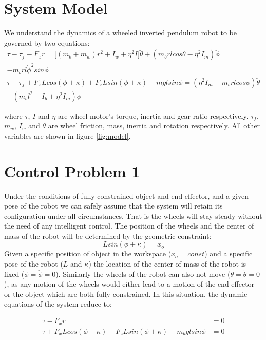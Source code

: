 \documentclass[a4paper,10pt]{article}
\begin{document}
\section{System Model}
We understand the dynamics of a wheeled inverted pendulum robot to be governed by two equations:
{\small
\begin{align}
 \tau - \tau_f - F_x r = \lbrack(m_b + m_w)r^2 + I_w + \eta^2 I\rbrack\ddot{\theta} + (m_brlcos\theta -\eta^2I_m)\ddot{\phi}&\nonumber \\
 - m_brl\dot{\phi}^2 sin\phi& \\
 \tau - \tau_f + F_x L cos(\phi+\kappa) + F_z L sin(\phi+\kappa) - mglsin\phi = (\eta^2I_m - m_brlcos\phi)\ddot{\theta}&  \nonumber \\
 - (m_bl^2+I_b+\eta^2I_m)\ddot{\phi}&
\end{align}
}

where $\tau$, $I$ and $\eta$ are wheel motor's torque, inertia and gear-ratio respectively. $\tau_f$, $m_w$, $I_w$ and $\theta$ are
wheel friction, mass, inertia and rotation respectively. All other variables are shown in figure \ref{fig:model}.

\section{Control Problem 1}
Under the conditions of fully constrained object and end-effector, and a given pose of the robot
we can safely assume that the system will retain its configuration under all circumstances. That is
the wheels will stay steady without the need of any intelligent control. The position of the wheels and the center 
of mass of the robot will be determined by the geometric constraint:
\[
  Lsin(\phi+\kappa) = x_o 
\]
Given a specific position of object in the workspace ($x_o = const$) and a specific pose of the robot ($L$ and $\kappa$)
the location of the center of mass of the robot is fixed ($\dot\phi = \ddot\phi = 0$). Similarly the wheels
of the robot can also not move ($\dot\theta = \ddot\theta = 0$), as any motion of the wheels would either lead to a motion of the end-effector or 
the object which are both fully constrained. In this situation, the dynamic equations of the system reduce to:

\begin{align}
 \tau - F_xr &= 0 \\
 \tau + F_xLcos(\phi+\kappa) + F_zLsin(\phi+\kappa) - m_bglsin\phi &= 0 \label{eq:FLinDep}
\end{align}
\end{document}
